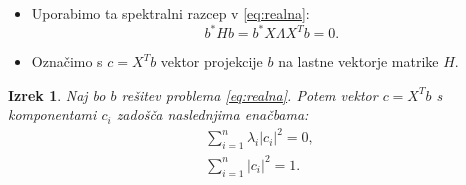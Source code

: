 \documentclass{beamer}
\newcommand{\abs}[1]{ \left\lvert#1\right\rvert}
\newcommand{\norm}[1]{\left\lVert#1\right\rVert}
\newtheorem{izrek}{Izrek}
\begin{document}
\begin{frame}
\begin{itemize}
\item Uporabimo ta spektralni razcep v \eqref{eq:realna}: $$b^\ast Hb=b^\ast X\Lambda X^T b=0.$$ 
\item  Označimo s $c=X^Tb$ vektor projekcije $b$ na lastne vektorje matrike $H$. 
\end{itemize}\pause
\begin{izrek} \label{izrek2}
Naj bo $b$ rešitev problema \eqref{eq:realna}. Potem vektor $c=X^T b$ s komponentami $c_i$ zadošča naslednjima enačbama:
\begin{align}
\sum_{i=1}^{n} \lambda_i \abs{c_i}^2=0 \label{eq:en1},\\
\sum_{i=1}^{n}\abs{c_i}^2=1. \label{eq:en2}
\end{align}
\end{izrek}
\end{frame}
\end{document}
